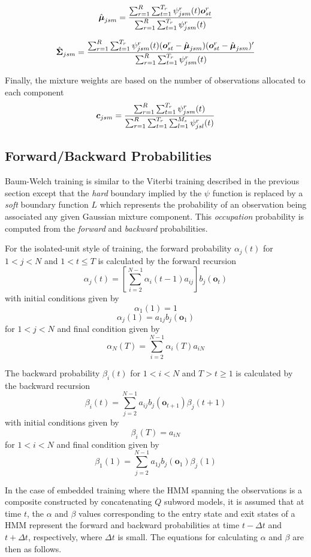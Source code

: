\[
   \hat{{\mbox{\boldmath $\mu$}}}_{jsm} = \frac{
                \sum_{r=1}^R \sum_{t=1}^{T_r}  \psi^r_{jsm}(t){\mbox{\boldmath $o$}}^r_{st}}{\sum_{r=1}^R \sum_{t=1}^{T_r}  \psi^r_{jsm}(t)}
\]

\[
   \hat{{\mbox{\boldmath $\Sigma$}}}_{jsm} = \frac{
        \sum_{r=1}^R \sum_{t=1}^{T_r}  \psi^r_{jsm}(t)({\mbox{\boldmath $o$}}^r_{st} - \hat{{\mbox{\boldmath $\mu$}}}_{jsm})
                                        ({\mbox{\boldmath $o$}}^r_{st} - \hat{{\mbox{\boldmath $\mu$}}}_{jsm})'
                }{\sum_{r=1}^R \sum_{t=1}^{T_r}  \psi^r_{jsm}(t)}
\]

Finally, the mixture  weights are based on the number of
observations allocated to each component
\[
   {\mbox{\boldmath $c$}}_{jsm} = \frac{\sum_{r=1}^R \sum_{t=1}^{T_r}  \psi^r_{jsm}(t)}{
        \sum_{r=1}^R \sum_{t=1}^{T_r} \sum_{l=1}^{M_s} \psi^r_{jsl}(t) }
\]

\subsection{Forward/Backward Probabilities}

Baum-Welch training is similar to the Viterbi training described
in the previous section except that the \textit{hard} boundary implied
by the $\psi$ function is replaced by a \textit{soft} boundary
function $L$ which represents the probability of an observation being
associated any given Gaussian mixture component.  
This \textit{occupation} probability is computed from the \textit{forward}
and \textit{backward} probabilities.

For the isolated-unit style of training, the forward 
probability $\alpha_j(t)$ for $1<j<N$ and
$1<t \leq T$ is calculated by the forward recursion
\[
    \alpha_j(t) = \left[ \sum_{i=2}^{N-1} \alpha_i(t-1) a_{ij} \right]
                     b_j(\bm{o}_t)
\]
with initial conditions given by 
\[
    \alpha_1(1) = 1
\]
\[
    \alpha_j(1) = a_{1j} b_j(\bm{o}_1)
\]
for $1<j<N$ and final condition given by
\[
    \alpha_N(T) = \sum_{i=2}^{N-1} \alpha_i(T) a_{iN}
\]

The backward probability $\beta_i(t)$ for $1<i<N$ and $T>t \geq 1$ is 
calculated by the backward recursion
\[
   \beta_i(t) = \sum_{j=2}^{N-1} a_{ij} b_j(\bm{o}_{t+1}) \beta_j(t+1)
\]
with initial conditions given by
\[
   \beta_i(T) = a_{iN}
\]
for $1<i<N$ and final condition given by
\[
   \beta_1(1) = \sum_{j=2}^{N-1} a_{1j} b_j(\bm{o}_1) \beta_j(1)
\]

In the case of embedded training where the HMM spanning the observations
is a composite constructed by concatenating $Q$ subword models, it is
assumed that at time $t$, the $\alpha$ and $\beta$
values corresponding to the entry state and exit states of a HMM
represent the forward and backward probabilities at time $t-\Delta t$
and $t+\Delta t$, respectively, where $\Delta t$ is small.  The equations
for calculating $\alpha$ and $\beta$ are then as follows.

